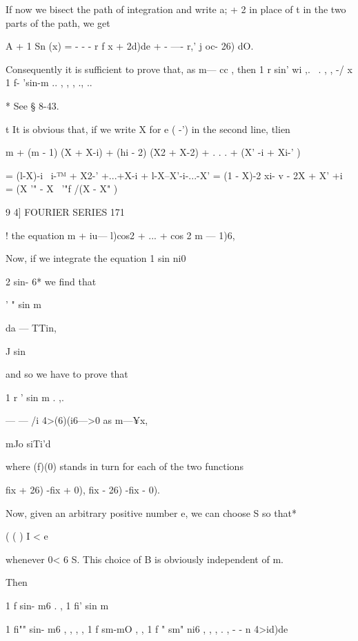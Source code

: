 If now we bisect the path of integration and write a; + 2  in place of t in 
the two parts of the path, we get 

A + 1 Sn (x) = - - - r  f x + 2d)de + - —- r,' j oc- 26) dO. 

Consequently it is sufficient to prove that, as m— cc , then 
1 r sin' wi  ,. \  . ,  , -/  x 1 f- 'sin-m  ..   , ,  , ., .. 



* See § 8-43. 

t It is obvious that, if we write X for e ( -') in the second line, tlien 

m + (m - 1) (X + X-i) + (hi - 2) (X2 + X-2) + . . . + (X' -i + Xi-' ) 

= (l-X)-i \ i-™ + X2-' +...+X-i + l-X--X'-i-...-X'   
= (1 - X)-2  xi- v - 2X + X' +i  = (X '" - X~ '"f /(X  - X" )  



9 4] FOURIER SERIES 171 

! the equation 
 m +  iu— l)cos2 + ... + cos 2 m — 1)6, 



Now, if we integrate the equation 
1 sin  ni0 



2 sin- 6* 
we find that 



' " sin m  

da —  TTin, 



J sin 

and so we have to prove that 

1 r ' sin m  . ,. 

— —  /i 4>(6)(i6—>0 as m—¥x, 

mJo siTi'd 

where (f)(0) stands in turn for each of the two functions 

fix + 26) -fix + 0), fix - 26) -fix - 0). 

Now, given an arbitrary positive number e, we can choose S so that* 

(  ( ) I < e 

whenever 0< 6  S. This choice of B is obviously independent of m. 

Then 

1 f  sin- m6 .   ,  1 fi' sin m  



1 fi"" sin- m6 , , , ,  1 f sm-mO ,   ,  1 f " sm"  ni6 , , , . ,  
- - n 4>id)de %

